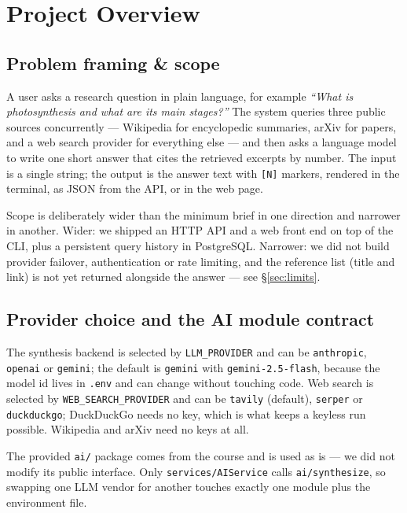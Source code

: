 \documentclass[11pt,a4paper]{article}
\newcommand{\code}[1]{\texttt{\small #1}}
\begin{document}
\section{Project Overview}

\subsection{Problem framing \& scope}
A user asks a research question in plain language, for example \emph{``What is
photosynthesis and what are its main stages?''} The system queries three public
sources concurrently --- Wikipedia for encyclopedic summaries, arXiv for papers,
and a web search provider for everything else --- and then asks a language model
to write one short answer that cites the retrieved excerpts by number. The input
is a single string; the output is the answer text with \code{[N]} markers,
rendered in the terminal, as JSON from the API, or in the web page.

Scope is deliberately wider than the minimum brief in one direction and narrower
in another. Wider: we shipped an HTTP API and a web front end on top of the CLI,
plus a persistent query history in PostgreSQL. Narrower: we did not build
provider failover, authentication or rate limiting, and the reference list
(title and link) is not yet returned alongside the answer --- see
\S\ref{sec:limits}.

\subsection{Provider choice and the AI module contract}
The synthesis backend is selected by \code{LLM\_PROVIDER} and can be
\code{anthropic}, \code{openai} or \code{gemini}; the default is \code{gemini}
with \code{gemini-2.5-flash}, because the model id lives in \code{.env} and can
change without touching code. Web search is selected by
\code{WEB\_SEARCH\_PROVIDER} and can be \code{tavily} (default), \code{serper}
or \code{duckduckgo}; DuckDuckGo needs no key, which is what keeps a keyless run
possible. Wikipedia and arXiv need no keys at all.

The provided \code{ai/} package comes from the course and is used as is --- we
did not modify its public interface. Only \code{services/AIService} calls
\code{ai/synthesize}, so swapping one LLM vendor for another touches exactly one
module plus the environment file.

\end{document}
